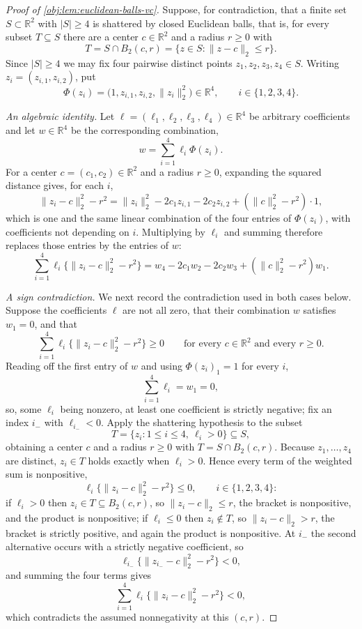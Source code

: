 \begin{proof}[Proof of \cref{obj:lem:euclidean-balls-vc}]
Suppose, for contradiction, that a finite set \(S\subset\mathbb R^2\) with \(|S|\ge4\) is
shattered by closed Euclidean balls, that is, for every subset \(T\subseteq S\) there are a
center \(c\in\mathbb R^2\) and a radius \(r\ge0\) with
\[
T=S\cap B_2(c,r)=\{z\in S:\|z-c\|_2\leq r\} .
\]
Since \(|S|\ge4\) we may fix four pairwise distinct points \(z_1,z_2,z_3,z_4\in S\).
Writing \(z_i=(z_{i,1},z_{i,2})\), put
\[
\Phi(z_i)=\bigl(1,z_{i,1},z_{i,2},\|z_i\|_2^2\bigr)\in\mathbb R^4 ,
\qquad i\in\{1,2,3,4\} .
\]

\emph{An algebraic identity.}  Let \(\ell=(\ell_1,\ell_2,\ell_3,\ell_4)\in\mathbb R^4\) be
arbitrary coefficients and let \(w\in\mathbb R^4\) be the corresponding combination,
\[
w=\sum_{i=1}^4\ell_i\Phi(z_i) .
\]
For a center \(c=(c_1,c_2)\in\mathbb R^2\) and a radius \(r\ge0\), expanding the squared
distance gives, for each \(i\),
\[
\|z_i-c\|_2^2-r^2
=
\|z_i\|_2^2-2c_1z_{i,1}-2c_2z_{i,2}+(\|c\|_2^2-r^2)\cdot 1 ,
\]
which is one and the same linear combination of the four entries of \(\Phi(z_i)\), with
coefficients not depending on \(i\).  Multiplying by \(\ell_i\) and summing therefore
replaces those entries by the entries of \(w\):
\[
\sum_{i=1}^4\ell_i\{\|z_i-c\|_2^2-r^2\}
=
w_4-2c_1w_2-2c_2w_3+(\|c\|_2^2-r^2)w_1 .
\]

\emph{A sign contradiction.}  We next record the contradiction used in both cases below.
Suppose the coefficients \(\ell\) are not all zero, that their combination \(w\) satisfies
\(w_1=0\), and that
\[
\sum_{i=1}^4\ell_i\{\|z_i-c\|_2^2-r^2\}\ge 0
\qquad\text{for every }c\in\mathbb R^2\text{ and every }r\ge0 .
\]
Reading off the first entry of \(w\) and using \(\Phi(z_i)_1=1\) for every \(i\),
\[
\sum_{i=1}^4\ell_i=w_1=0 ,
\]
so, some \(\ell_i\) being nonzero, at least one coefficient is strictly negative; fix an
index \(i_-\) with \(\ell_{i_-}<0\).
Apply the shattering hypothesis to the subset
\[
T=\{z_i:1\le i\le 4,\ \ell_i>0\}\subseteq S ,
\]
obtaining a center \(c\) and a radius \(r\ge0\) with \(T=S\cap B_2(c,r)\).  Because
\(z_1,\ldots,z_4\) are distinct, \(z_i\in T\) holds exactly when \(\ell_i>0\).  Hence every
term of the weighted sum is nonpositive,
\[
\ell_i\{\|z_i-c\|_2^2-r^2\}\le0 ,\qquad i\in\{1,2,3,4\} :
\]
if \(\ell_i>0\) then \(z_i\in T\subseteq B_2(c,r)\), so \(\|z_i-c\|_2\le r\), the bracket
is nonpositive, and the product is nonpositive; if \(\ell_i\le0\) then \(z_i\notin T\), so
\(\|z_i-c\|_2>r\), the bracket is strictly positive, and again the product is nonpositive.
At \(i_-\) the second alternative occurs with a strictly negative coefficient, so
\[
\ell_{i_-}\{\|z_{i_-}-c\|_2^2-r^2\}<0 ,
\]
and summing the four terms gives
\[
\sum_{i=1}^4\ell_i\{\|z_i-c\|_2^2-r^2\}<0 ,
\]
which contradicts the assumed nonnegativity at this \((c,r)\).


\end{proof}
